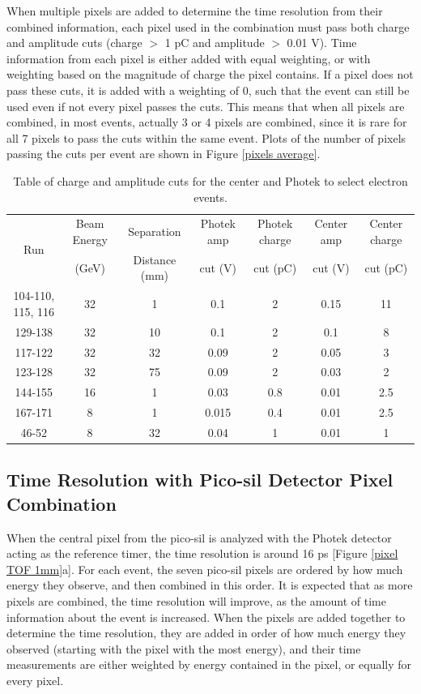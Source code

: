 \documentclass[twocolumn,aps,prd,reprint]{revtex4-1}
\begin{document}
When multiple pixels are added to determine the time resolution from their combined information, each pixel used in the combination must pass both charge and amplitude cuts (charge $>$ 1 pC and amplitude $>$ 0.01 V). Time information from each pixel is either added with equal weighting, or with weighting based on the magnitude of charge the pixel contains. If a pixel does not pass these cuts, it is added with a weighting of 0, such that the event can still be used even if not every pixel passes the cuts. This means that when all pixels are combined, in most events, actually 3 or 4 pixels are combined, since it is rare for all 7 pixels to pass the cuts within the same event. Plots of the number of pixels passing the cuts per event are shown in Figure \ref{pixels average}.

\begin{centering}
\begin{table}[!htbp]
  \begin{tabular}{ | c | c | c | c | c | c | c | }
    \hline
    \multirow{2}{*}{Run} & Beam Energy & Separation & Photek amp & Photek charge & Center amp & Center charge \\
 & (GeV) & Distance (mm) & cut (V) & cut (pC) & cut (V) & cut (pC) \\ \hline
    104-110, 115, 116 & 32 & 1 & 0.1 & 2 & 0.15 & 11 \\ \hline
    129-138 & 32 & 10 & 0.1 & 2 & 0.1 & 8 \\ \hline
    117-122 & 32 & 32 & 0.09 & 2 & 0.05 & 3 \\	\hline
    123-128 & 32 & 75 & 0.09 & 2 & 0.03 & 2 \\ \hline
    144-155 & 16 & 1 & 0.03 & 0.8 & 0.01 & 2.5 \\ \hline
	167-171 & 8 & 1 & 0.015 & 0.4 & 0.01 & 2.5 \\ \hline
	46-52 & 8 & 32 & 0.04 & 1 & 0.01 & 1 \\ \hline
  \end{tabular}
\caption[Table caption text]{Table of charge and amplitude cuts for the center and Photek to select electron events.}
\label{table:cuts}
\end{table}
\end{centering}

\subsection{Time Resolution with Pico-sil Detector Pixel Combination}

When the central pixel from the pico-sil is analyzed with the Photek detector acting as the reference timer, the time resolution is around 16 ps [Figure \ref{pixel TOF 1mm}a]. For each event, the seven pico-sil pixels are ordered by how much energy they observe, and then combined in this order. It is expected that as more pixels are combined, the time resolution will improve, as the amount of time information about the event is increased. When the pixels are added together to determine the time resolution, they are added in order of how much energy they observed (starting with the pixel with the most energy), and their time measurements are either weighted by energy contained in the pixel, or equally for every pixel.
\end{document}
